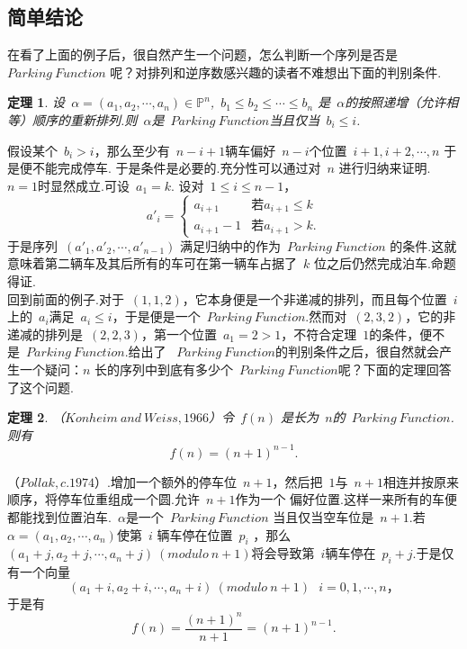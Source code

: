 \documentclass[a4paper,11pt]{article}
\newtheorem{thm}{定理}
\def\pf{\noindent {\bf 证明\ }}
\begin{document}
\subsection{简单结论}
在看了上面的例子后，很自然产生一个问题，怎么判断一个序列是否是~$Parking\ Function$ 呢？对排列和逆序数感兴趣的读者不难想出下面的判别条件.\\
\begin{thm}
设~$\alpha=(a_1,a_2,\cdots,a_n)\in \mathbb{P}^n$,~$b_1\leq b_2\leq \cdots \leq b_n$ 是~$\alpha$的按照递增（允许相等）顺序的重新排列.则~$\alpha$是~$Parking\ Function$当且仅当~$b_i\leq i$.
\end{thm}
\pf
假设某个~$b_i>i$，那么至少有~$n-i+1$辆车偏好~$n-i$个位置~$i+1,i+2,\cdots,n$ 于是便不能完成停车.
于是条件是必要的.充分性可以通过对~$n$ 进行归纳来证明.~$n=1$时显然成立.可设~$a_1=k$. 设对~$1\leq i\leq n-1$，\\
\begin{equation*}
a'_i=
\begin{cases}a_{i+1} & \text{若} a_{i+1}\leq k\\a_{i+1}-1 & \text{若} a_{i+1}>k.
\end{cases}
\end{equation*}
于是序列~$(a'_1,a'_2,\cdots,a'_{n-1})$ 满足归纳中的作为~$Parking\ Function$ 的条件.这就意味着第二辆车及其后所有的车可在第一辆车占据了~$k$ 位之后仍然完成泊车.命题得证.\\
\indent 回到前面的例子.对于~$(1,1,2)$，它本身便是一个非递减的排列，而且每个位置~$i$ 上的~$a_i$满足~$a_i \leq i$，于是便是一个~$Parking\ Function$.然而对~$(2,3,2)$，它的非递减的排列是~$(2,2,3)$，第一个位置~$a_1=2 > 1$，不符合定理~$1$的条件，便不是~$Parking\ Function$.给出了
~$Parking\ Function$的判别条件之后，很自然就会产生一个疑问：$n$ 长的序列中到底有多少个~$Parking\ Function$呢？下面的定理回答了这个问题.
\begin{thm}
（$Konheim\ and\ Weiss,1966$）令~$f(n)$ 是长为~$n$的~$Parking\ Function$.则有
\[f(n)=(n+1)^{n-1}.\]
\end{thm}
\pf
（$Pollak,c.1974$）.增加一个额外的停车位~$n+1$，然后把~$1$与~$n+1$相连并按原来顺序，将停车位重组成一个圆.允许~$n+1$作为一个
偏好位置.这样一来所有的车便都能找到位置泊车.~$\alpha$是一个~$Parking\ Function$ 当且仅当空车位是~$n+1$.若~$\alpha=(a_1,a_2,\cdots,a_n)$使第~$i$ 辆车停在位置~$p_i$
，那么~$(a_1+j,a_2+j,\cdots,a_n+j)\ (modulo\  n+1)$将会导致第~$i$辆车停在~$p_i+j$.于是仅有一个向量
\[(a_1+i,a_2+i,\cdots,a_n+i)\ (modulo\ n+1)\ \ \ i=0,1,\cdots,n，\]
于是有
\[ f(n)=\frac{(n+1)^n}{n+1}=(n+1)^{n-1}.\]
\end{document}
